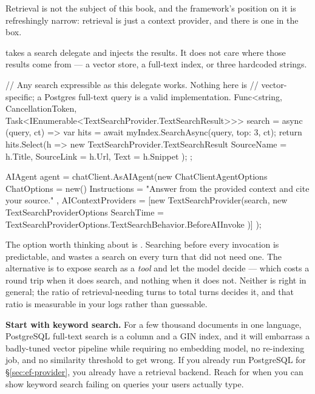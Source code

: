 Retrieval is not the subject of this book, and the framework's position on it is
refreshingly narrow: retrieval is just a context provider, and there is one in
the box.

 takes a search delegate and injects the results. It does
not care where those results come from --- a vector store, a full-text index, or
three hardcoded strings.

\begin{csharp}[caption={Retrieval as a context provider}, label={lst:text-search}]
// Any search expressible as this delegate works. Nothing here is
// vector-specific; a Postgres full-text query is a valid implementation.
Func<string, CancellationToken, Task<IEnumerable<TextSearchProvider.TextSearchResult>>> search =
    async (query, ct) =>
    {
        var hits = await myIndex.SearchAsync(query, top: 3, ct);
        return hits.Select(h => new TextSearchProvider.TextSearchResult
        {
            SourceName = h.Title,
            SourceLink = h.Url,
            Text = h.Snippet
        });
    };

AIAgent agent = chatClient.AsAIAgent(new ChatClientAgentOptions
{
    ChatOptions = new()
    {
        Instructions = "Answer from the provided context and cite your source."
    },
    AIContextProviders = [new TextSearchProvider(search, new TextSearchProviderOptions
    {
        SearchTime = TextSearchProviderOptions.TextSearchBehavior.BeforeAIInvoke
    })]
});
\end{csharp}

The option worth thinking about is . Searching before every
invocation is predictable, and wastes a search on every turn that did not need
one. The alternative is to expose search as a \emph{tool} and let the model
decide --- which costs a round trip when it does search, and nothing when it does
not. Neither is right in general; the ratio of retrieval-needing turns to total
turns decides it, and that ratio is measurable in your logs rather than
guessable.

\begin{note}
\textbf{Start with keyword search.} For a few thousand documents in one language,
PostgreSQL full-text search is a  column and a GIN index, and it
will embarrass a badly-tuned vector pipeline while requiring no embedding model,
no re-indexing job, and no similarity threshold to get wrong. If you already run
PostgreSQL for \S\ref{sec:ef-provider}, you already have a retrieval backend.
Reach for  when you can show keyword search failing on queries
your users actually type.
\end{note}

